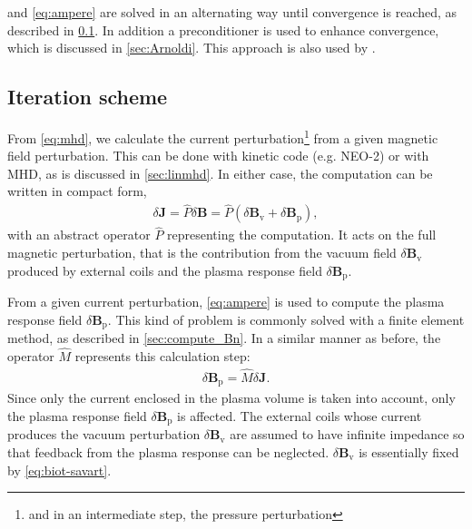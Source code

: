\documentclass[a4paper, twoside, 10pt, english]{article}
\numberwithin{equation}{section}
\let\vec\symbf
\newcommand*\Bvac{\ensuremath{\delta \vec{B}_{\text{v}}}}  %
\newcommand*\Bplas{\ensuremath{\delta \vec{B}_{\text{p}}}}  %
\newcommand*\Bpert{\ensuremath{\delta \vec{B}}}  %
\begin{document}
 and \cref{eq:ampere} are solved in an alternating way until convergence is reached, as described in \cref{sec:iteration}. In addition a preconditioner is used to enhance convergence, which is discussed in \cref{sec:Arnoldi}. This approach is also used by \cite{Albert16}.

\subsection{Iteration scheme}
\label{sec:iteration}

From \cref{eq:mhd}, we calculate the current perturbation\footnote{and in an intermediate step, the pressure perturbation} from a given magnetic field perturbation. This can be done with kinetic code (e.g. NEO-2) or with MHD, as is discussed in \cref{sec:linmhd}. In either case, the computation can be written in compact form,
\begin{gather}
  \delta \vec{J} = \hat{P} \Bpert = \hat{P} \left ( \Bvac + \Bplas \right ), \label{eq:P_operator}
\end{gather}
with an abstract operator $\hat{P}$ representing the computation. It acts on the full magnetic perturbation, that is the contribution from the vacuum field $\Bvac$ produced by external coils and the plasma response field $\Bplas$.

From a given current perturbation, \cref{eq:ampere} is used to compute the plasma response field $\Bplas$. This kind of problem is commonly solved with a finite element method, as described in \cref{sec:compute_Bn}. In a similar manner as before, the operator $\hat{M}$ represents this calculation step:
\begin{gather}
  \Bplas = \hat{M} \delta \vec{J}. \label{eq:M_operator}
\end{gather}
Since only the current enclosed in the plasma volume is taken into account, only the plasma response field $\Bplas$ is affected. The external coils whose current produces the vacuum perturbation $\Bvac$ are assumed to have infinite impedance so that feedback from the plasma response can be neglected. $\Bvac$ is essentially fixed by \cref{eq:biot-savart}.
\end{document}
